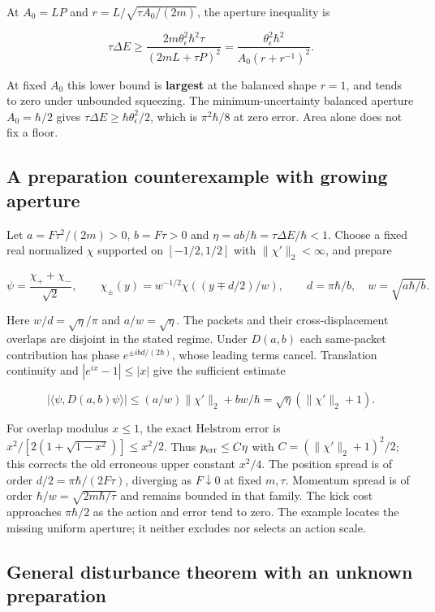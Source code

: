 \documentclass[11pt,a4paper]{article}
\begin{document}
At \(A_0=LP\) and \(r=L/\sqrt{\tau A_0/(2m)}\), the aperture inequality
is

\[\tau\Delta E\ge\frac{2m\theta_\epsilon^2\hbar^2\tau}{(2mL+\tau P)^2}
 =\frac{\theta_\epsilon^2\hbar^2}{A_0(r+r^{-1})^2}.\]

At fixed \(A_0\) this lower bound is \textbf{largest} at the balanced
shape \(r=1\), and tends to zero under unbounded squeezing. The
minimum-uncertainty balanced aperture \(A_0=\hbar/2\) gives
\(\tau\Delta E\ge\hbar\theta_\epsilon^2/2\), which is \(\pi^2\hbar/8\)
at zero error. Area alone does not fix a floor.

\hypertarget{a-preparation-counterexample-with-growing-aperture}{%
\subsection{A preparation counterexample with growing
aperture}\label{a-preparation-counterexample-with-growing-aperture}}

Let \(a=F\tau^2/(2m)>0\), \(b=F\tau>0\) and
\(\eta=ab/\hbar=\tau\Delta E/\hbar<1\). Choose a fixed real normalized
\(\chi\) supported on \([-1/2,1/2]\) with \(\|\chi'\|_2<\infty\), and
prepare

\[\psi=\frac{\chi_++\chi_-}{\sqrt2},\qquad
\chi_\pm(y)=w^{-1/2}\chi((y\mp d/2)/w),\qquad
d=\pi\hbar/b,\quad w=\sqrt{a\hbar/b}.\]

Here \(w/d=\sqrt\eta/\pi\) and \(a/w=\sqrt\eta\). The packets and their
cross-displacement overlaps are disjoint in the stated regime. Under
\(D(a,b)\) each same-packet contribution has phase
\(e^{\pm ibd/(2\hbar)}\), whose leading terms cancel. Translation
continuity and \(|e^{ix}-1|\le|x|\) give the sufficient estimate

\[|\langle\psi,D(a,b)\psi\rangle|
 \le(a/w)\|\chi'\|_2+bw/\hbar
 =\sqrt\eta(\|\chi'\|_2+1).\]

For overlap modulus \(x\le1\), the exact Helstrom error is
\(x^2/[2(1+\sqrt{1-x^2})]\le x^2/2\). Thus \(p_{\rm err}\le C\eta\) with
\(C=(\|\chi'\|_2+1)^2/2\); this corrects the old erroneous upper
constant \(x^2/4\). The position spread is of order
\(d/2=\pi\hbar/(2F\tau)\), diverging as \(F\downarrow0\) at fixed
\(m,\tau\). Momentum spread is of order \(\hbar/w=\sqrt{2m\hbar/\tau}\)
and remains bounded in that family. The kick cost approaches
\(\pi\hbar/2\) as the action and error tend to zero. The example locates
the missing uniform aperture; it neither excludes nor selects an action
scale.

\hypertarget{general-disturbance-theorem-with-an-unknown-preparation}{%
\subsection{General disturbance theorem with an unknown
preparation}\label{general-disturbance-theorem-with-an-unknown-preparation}}
\end{document}
